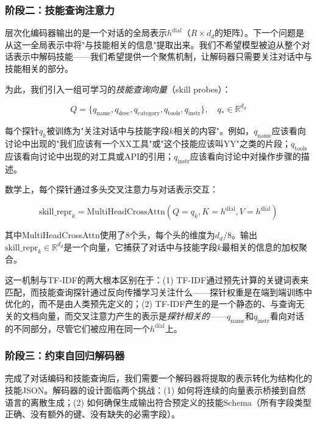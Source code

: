 \documentclass[conference]{IEEEtran}
\begin{document}
\subsubsection{阶段二：技能查询注意力}

层次化编码器输出的是一个对话的全局表示$h^{\mathrm{dial}}$（$R \times d_d$的矩阵）。下一个问题是从这一全局表示中将"与技能相关的信息"提取出来。我们不希望模型被迫从整个对话表示中解码技能——我们希望提供一个聚焦机制，让解码器只需要关注对话中与技能相关的部分。

为此，我们引入一组可学习的\emph{技能查询向量}（skill probes）：

\begin{equation}
Q = \{q_{\mathrm{name}}, q_{\mathrm{desc}}, q_{\mathrm{category}}, q_{\mathrm{tools}}, q_{\mathrm{instr}}\}, \quad q_* \in \mathbb{R}^{d_d}
\label{eq:skill_probes}
\end{equation}

每个探针$q_k$被训练为"关注对话中与技能字段$k$相关的内容"。例如，$q_{\mathrm{name}}$应该看向讨论中出现的"我们应该有一个XX工具"或"这个技能应该叫YY"之类的片段；$q_{\mathrm{tools}}$应该看向讨论中出现的对工具或API的引用；$q_{\mathrm{instr}}$应该看向讨论中对操作步骤的描述。

数学上，每个探针通过多头交叉注意力与对话表示交互：

\begin{equation}
\mathrm{skill\_repr}_k = \mathrm{MultiHeadCrossAttn}(Q=q_k, K=h^{\mathrm{dial}}, V=h^{\mathrm{dial}})
\label{eq:cross_attn}
\end{equation}

其中MultiHeadCrossAttn使用了8个头，每个头的维度为$d_d/8$。输出$\mathrm{skill\_repr}_k \in \mathbb{R}^{d_d}$是一个向量，它捕获了对话中与技能字段$k$最相关的信息的加权聚合。

这一机制与TF-IDF的两大根本区别在于：(1) TF-IDF通过预先计算的关键词表来匹配，而技能查询探针通过反向传播学习关注什么——探针权重是在端到端训练中优化的，而不是由人类预先定义的；(2) TF-IDF产生的是一个静态的、与查询无关的文档向量，而交叉注意力产生的表示是\emph{探针相关的}——$q_{\mathrm{name}}$和$q_{\mathrm{instr}}$看向对话的不同部分，尽管它们被应用在同一个$h^{\mathrm{dial}}$上。

\subsubsection{阶段三：约束自回归解码器}

完成了对话编码和技能查询后，我们需要一个解码器将提取的表示转化为结构化的技能JSON。解码器的设计面临两个挑战：(1) 如何将连续的向量表示桥接到自然语言的离散生成；(2) 如何确保生成输出符合预定义的技能Schema（所有字段类型正确、没有额外的键、没有缺失的必需字段）。
\end{document}
